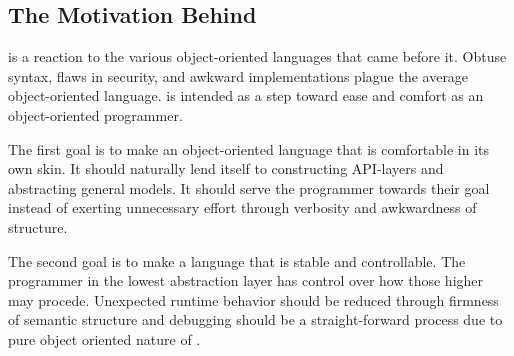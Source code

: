 \subsection{The Motivation Behind \Lang{}}
\Lang{} is a reaction to the various object-oriented languages that came before it. Obtuse syntax, flaws in security, and awkward implementations plague the average object-oriented language. \Lang{} is intended as a step toward ease and comfort as an object-oriented programmer.

The first goal is to make an object-oriented language that is comfortable in its own skin. It should naturally lend itself to constructing API-layers and abstracting general models. It should serve the programmer towards their goal instead of exerting unnecessary effort through verbosity and awkwardness of structure.

The second goal is to make a language that is stable and controllable. The programmer in the lowest abstraction layer has control over how those higher may procede. Unexpected runtime behavior should be reduced through firmness of semantic structure and debugging should be a straight-forward process due to pure object oriented nature of \Lang{}.
